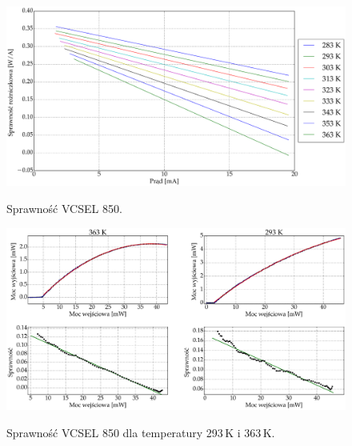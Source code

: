 \begin{figure}
\center
  \includegraphics[scale=0.30]{plot_vcsel_850/plot_eff_all_via_current.eps}
  \label{rys1}
  \caption{Sprawność VCSEL 850.} 
\end{figure}
\begin{figure}
\center
  \includegraphics[scale=0.30]{plot_vcsel_850/plot_eff_20_90_via_power.eps}
  \label{rys1}
  \caption{Sprawność VCSEL 850 dla temperatury 293\,K i 363\,K.} 
\end{figure}
